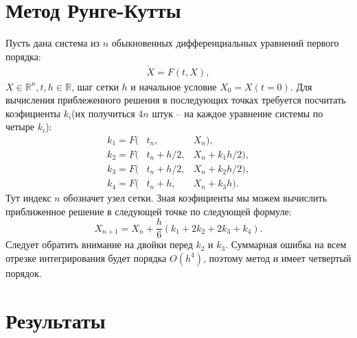 \documentclass[a4paper,12pt,titlepage]{article}
\theoremstyle{definition}
\theoremstyle{theorem}
\theoremstyle{definition}
\begin{document}
\section{Метод Рунге-Кутты}
Пусть дана система из $n$ обыкновенных 
дифференциальных уравнений первого порядка:
\begin{eqnarray}
    \dot{X}  = F(t, X),
\end{eqnarray}
$X \in \mathbb{R}^n, t, h \in \mathbb{R}$, шаг сетки $h$  и начальное условие $X_0 = X(t = 0)$.
Для вычисления приблеженного решения в последующих точках требуется посчитать коэфициенты 
$k_i$(их получиться $4n$ штук -- на каждое уравнение системы по четыре $k_i$):
\begin{eqnarray}
    k_1 = F(&t_n,& X_n), \\
    k_2 = F(&t_n + h/2,& X_n + k_1h/2), \\
    k_3 = F(&t_n + h/2,& X_n + k_2h/2), \\
    k_4 = F(&t_n + h,& X_n + k_3h).
\end{eqnarray}
Тут индекс $n$ обозначет узел сетки.
Зная коэфициенты мы можем вычислить 
приближенное решение в следующей точке по следующей формуле:
\begin{equation}
    X_{n+1} = X_n + \frac{h}{6}(k_1 + 2k_2 + 2k_3 + k_4).
\end{equation}
Следует обратить внимание на двойки перед $k_2$ и $k_3$.
Суммарная ошибка на всем отрезке интегрирования будет порядка $O(h^4)$, 
поэтому метод и имеет четвертый 
порядок.
\newpage
\section{Результаты}
\end{document}
